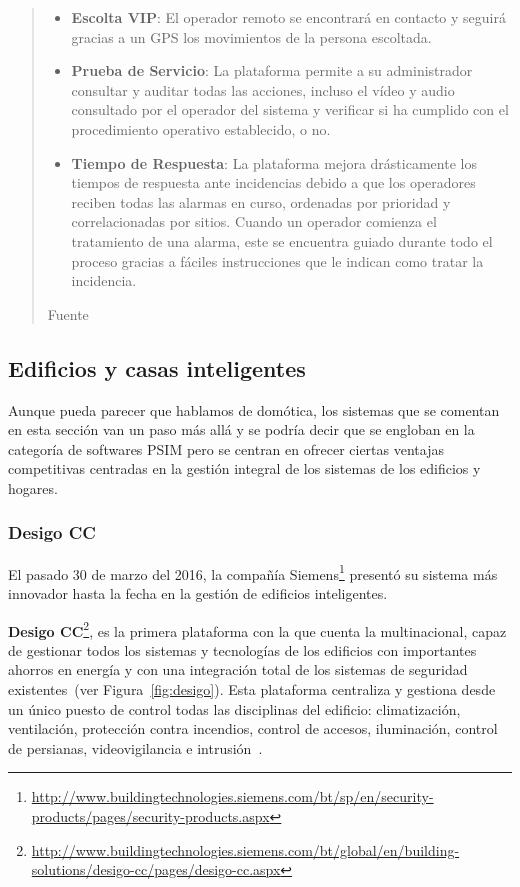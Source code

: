 \begin{quote}
\begin{itemize}
\item \textbf{Escolta \acs{VIP}}: El operador remoto se encontrará en contacto y seguirá gracias a un GPS los movimientos de la persona escoltada.
\item \textbf{Prueba de Servicio}: La plataforma permite a su administrador consultar y auditar todas las acciones, incluso el vídeo y audio consultado por el operador del sistema y verificar si ha cumplido con el procedimiento operativo establecido, o no.
\item \textbf{Tiempo de Respuesta}: La plataforma mejora drásticamente los tiempos de respuesta ante incidencias debido a que los operadores reciben todas las alarmas en curso, ordenadas por prioridad y correlacionadas por sitios. Cuando un operador comienza el tratamiento de una alarma, este se encuentra guiado durante todo el proceso gracias a fáciles instrucciones que le indican como tratar la incidencia.
\end{itemize}
\par\nointerlineskip\noindent\hfill Fuente~\cite{AGORA_PSIM}
\end{quote}

\subsection{Edificios y casas inteligentes}

Aunque pueda parecer que hablamos de domótica, los sistemas que se comentan en esta sección van un paso más allá y se podría decir que se engloban en la categoría de softwares \acs{PSIM} pero se centran en ofrecer ciertas ventajas competitivas centradas en la gestión integral de los sistemas de los edificios y hogares. 

\subsubsection{Desigo CC}

El pasado 30 de marzo del 2016, la compañía Siemens\footnote{\url{http://www.buildingtechnologies.siemens.com/bt/sp/en/security-products/pages/security-products.aspx}} presentó su sistema más innovador hasta la fecha en la gestión de edificios inteligentes.

\textbf{Desigo CC}\footnote{\url{http://www.buildingtechnologies.siemens.com/bt/global/en/building-solutions/desigo-cc/pages/desigo-cc.aspx}}, es la primera plataforma con la que cuenta la multinacional, capaz de gestionar todos los sistemas y tecnologías de los edificios con importantes ahorros en energía y con una integración total de los sistemas de seguridad existentes~(ver Figura~\ref{fig:desigo}). Esta plataforma centraliza y gestiona desde un único puesto de control todas las disciplinas del edificio: climatización, ventilación, protección contra incendios, control de accesos, iluminación, control de persianas, videovigilancia e intrusión~\cite{DESIGO}. 

